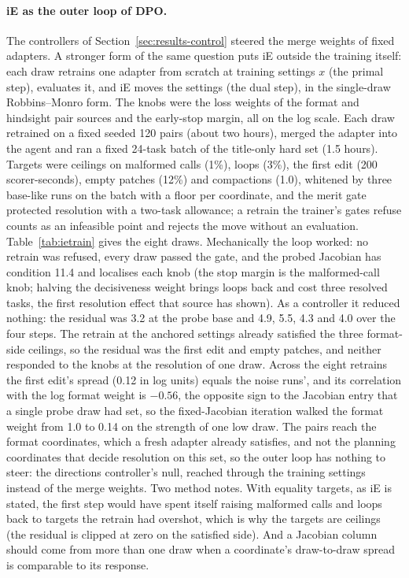 \documentclass[11pt]{article}
\begin{document}
\paragraph{iE as the outer loop of DPO.} The controllers of Section~\ref{sec:results-control} steered the merge weights of fixed adapters. A stronger form of the same question puts iE outside the training itself: each draw retrains one adapter from scratch at training settings $x$ (the primal step), evaluates it, and iE moves the settings (the dual step), in the single-draw Robbins--Monro form. The knobs were the loss weights of the format and hindsight pair sources and the early-stop margin, all on the log scale. Each draw retrained on a fixed seeded 120 pairs (about two hours), merged the adapter into the agent and ran a fixed 24-task batch of the title-only hard set (1.5 hours). Targets were ceilings on malformed calls (1\%), loops (3\%), the first edit (200 scorer-seconds), empty patches (12\%) and compactions (1.0), whitened by three base-like runs on the batch with a floor per coordinate, and the merit gate protected resolution with a two-task allowance; a retrain the trainer's gates refuse counts as an infeasible point and rejects the move without an evaluation. Table~\ref{tab:ietrain} gives the eight draws. Mechanically the loop worked: no retrain was refused, every draw passed the gate, and the probed Jacobian has condition 11.4 and localises each knob (the stop margin is the malformed-call knob; halving the decisiveness weight brings loops back and cost three resolved tasks, the first resolution effect that source has shown). As a controller it reduced nothing: the residual was 3.2 at the probe base and 4.9, 5.5, 4.3 and 4.0 over the four steps. The retrain at the anchored settings already satisfied the three format-side ceilings, so the residual was the first edit and empty patches, and neither responded to the knobs at the resolution of one draw. Across the eight retrains the first edit's spread (0.12 in log units) equals the noise runs', and its correlation with the log format weight is $-0.56$, the opposite sign to the Jacobian entry that a single probe draw had set, so the fixed-Jacobian iteration walked the format weight from 1.0 to 0.14 on the strength of one low draw. The pairs reach the format coordinates, which a fresh adapter already satisfies, and not the planning coordinates that decide resolution on this set, so the outer loop has nothing to steer: the directions controller's null, reached through the training settings instead of the merge weights. Two method notes. With equality targets, as iE is stated, the first step would have spent itself raising malformed calls and loops back to targets the retrain had overshot, which is why the targets are ceilings (the residual is clipped at zero on the satisfied side). And a Jacobian column should come from more than one draw when a coordinate's draw-to-draw spread is comparable to its response.
\end{document}
